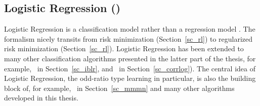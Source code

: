 {\fi




%
% 
\subsection{Logistic Regression (\lr)}\label{sc_lr}

Logistic Regression is a classification model rather than a regression model \citep{Bishop07}.
The formalism nicely transits from risk minimization (Section~\ref{sc_rl}) to regularized risk minimization (Section~\ref{sc_rl}).
Logistic Regression has been extended to many other classification algorithms presented in the latter part of the thesis, for example, \iblr\ in Section~\ref{sc_iblr}, and \corrlog\ in Section~\ref{sc_corrlog}).
The central idea of Logistic Regression, the odd-ratio type learning in particular, is also the building block of, for example, \mmmn\ in Section~\ref{sc_mmmn} and many other algorithms developed in this thesis.

}
